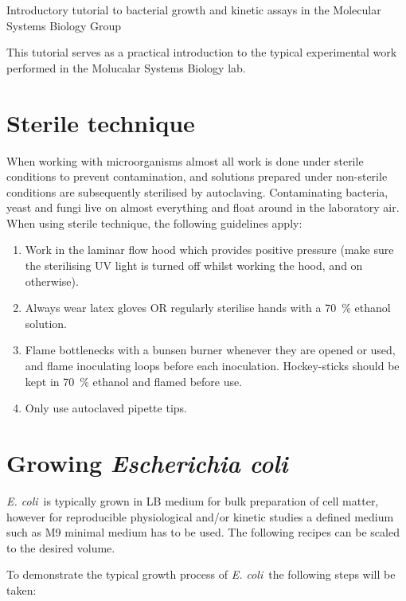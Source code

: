 \documentclass[a4paper]{article}
\newcommand{\ec}{\textit{E. coli}}
\begin{document}
 \begin{center} \huge Introductory tutorial to bacterial growth and kinetic assays in the Molecular
Systems Biology Group\\ \normalsize \end{center} \begin{multicols}{2}

This tutorial serves as a practical introduction to the typical experimental
work performed in the Molucalar Systems Biology lab.

\section{Sterile technique} 

When working with microorganisms almost all work is done under sterile
conditions to prevent contamination, and solutions prepared under non-sterile
conditions are subsequently sterilised by autoclaving. Contaminating bacteria,
yeast and fungi live on almost everything and float around in the laboratory
air. When using sterile technique, the following guidelines apply:

\begin{enumerate}
\item Work in the laminar flow hood which provides positive pressure (make sure the sterilising UV light is turned off whilst working the hood, and on otherwise).
\item Always wear latex gloves OR regularly sterilise hands with a 70~\% ethanol solution.
\item Flame bottlenecks with a bunsen burner whenever they are opened or used, and flame inoculating loops before each inoculation. Hockey-sticks should be kept in 70~\% ethanol and flamed before use.
\item Only use autoclaved pipette tips.
\end{enumerate}


\section{Growing \textit{Escherichia coli}} 

\ec\ is typically grown in LB medium for bulk preparation of cell matter,
however for reproducible physiological and/or kinetic studies a defined medium
such as M9 minimal medium has to be used. The following recipes can be scaled
to the desired volume.

To demonstrate the typical growth process of \ec\ the following steps will be
taken:


\end{multicols}
\end{document}
